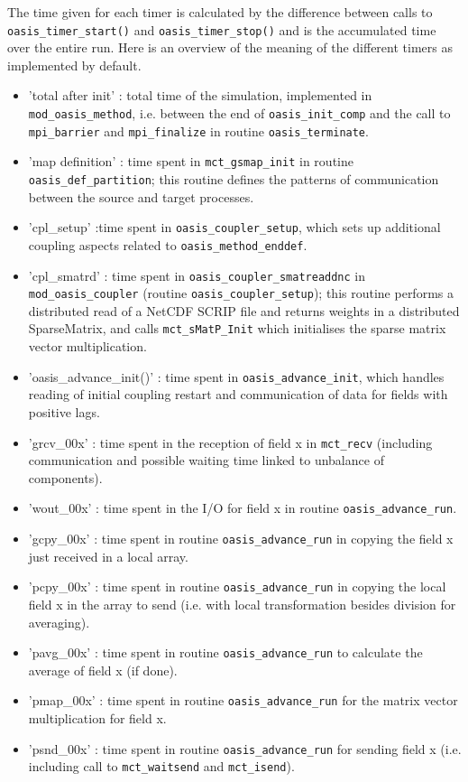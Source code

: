 The time given for each timer is calculated by the difference between calls to {\tt  oasis\_timer\_start()} and {\tt oasis\_timer\_stop()} and is the accumulated time over the entire run. Here is an overview of the meaning of the different timers as implemented by default. 

\begin{itemize}
\item {'total after init'} : total time of the simulation, implemented in {\tt mod\_oasis\_method}, i.e. between the end of {\tt oasis\_init\_comp} and the call to {\tt mpi\_barrier} and {\tt mpi\_finalize} in routine {\tt oasis\_terminate}.
\item {'map definition'} : time spent in {\tt mct\_gsmap\_init} in routine {\tt oasis\_def\_partition}; this routine defines the patterns of communication between the source and target processes.
\item {'cpl\_setup'} :time spent in {\tt oasis\_coupler\_setup}, which sets up additional coupling aspects related to {\tt oasis\_method\_enddef}.
\item {'cpl\_smatrd'} : time spent in {\tt oasis\_coupler\_smatreaddnc} in {\tt mod\_oasis\_coupler} (routine {\tt oasis\_coupler\_setup}); this routine performs a distributed read of a NetCDF SCRIP file and returns weights in a distributed SparseMatrix, and calls {\tt mct\_sMatP\_Init} which initialises the sparse matrix vector multiplication.
\item {'oasis\_advance\_init()'} : time spent in {\tt oasis\_advance\_init}, which handles reading of initial coupling  restart and communication of data for fields with positive lags.
\item {'grcv\_00x'} : time spent in the reception of field x in {\tt mct\_recv} (including communication and possible waiting time linked to unbalance of components).
\item {'wout\_00x'} : time spent in the I/O for field x in routine {\tt oasis\_advance\_run}.
\item {'gcpy\_00x'} : time spent in routine {\tt oasis\_advance\_run} in copying the field x just received in a local array.
\item {'pcpy\_00x'} : time spent in routine {\tt oasis\_advance\_run} in copying the local field x in the array to send (i.e. with local transformation besides division for averaging).
\item {'pavg\_00x'} : time spent in routine {\tt oasis\_advance\_run} to calculate the average of field x (if done).
\item {'pmap\_00x'} : time spent in routine {\tt oasis\_advance\_run} for the matrix vector multiplication for field x.
\item {'psnd\_00x'} : time spent in routine {\tt oasis\_advance\_run} for sending field x (i.e. including call to {\tt mct\_waitsend} and {\tt mct\_isend}).
\end{itemize}

